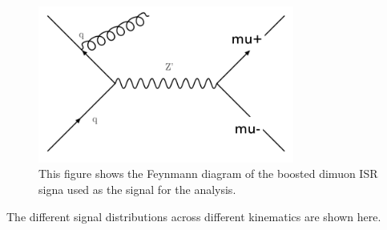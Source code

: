 \begin{figure}[!htb]
    \begin{center}
        \includegraphics[width=0.75\textwidth]{figures/chapter_dimuon/dimuonISRFeynmann}
        \caption{
        This figure shows the Feynmann diagram of the boosted dimuon ISR signa used as the signal for the analysis. }
            \label{fig:dimuonFeynmann}
    \end{center}
\end{figure}

    The different signal distributions across different kinematics are shown here. 

